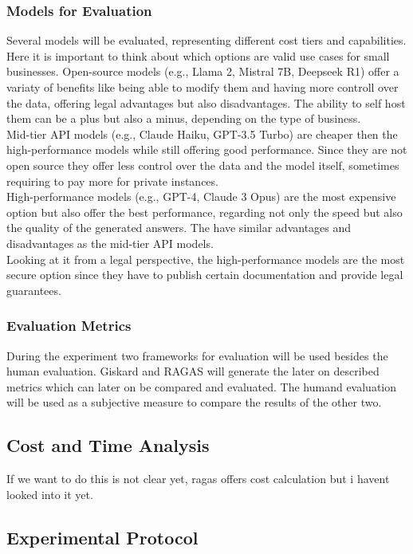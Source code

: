 \subsubsection{Models for Evaluation}
Several models will be evaluated, representing different cost tiers and capabilities.\\
Here it is important to think about which options are valid use cases for small businesses.
Open-source models (e.g., Llama 2, Mistral 7B, Deepseek R1) offer a variaty of benefits like being able to modify them and having more controll over the data, offering legal advantages but also disadvantages. The ability to self host them can be a plus but also a minus, depending on the type of business.\\
Mid-tier API models (e.g., Claude Haiku, GPT-3.5 Turbo) are cheaper then the high-performance models while still offering good performance. Since they are not open source they offer less control over the data and the model itself, sometimes requiring to pay more for private instances.\\
High-performance models (e.g., GPT-4, Claude 3 Opus) are the most expensive option but also offer the best performance, regarding not only the speed but also the quality of the generated answers. The have similar advantages and disadvantages as the mid-tier API models. \\
Looking at it from a legal perspective, the high-performance models are the most secure option since they have to publish certain documentation and provide legal guarantees.

\subsubsection{Evaluation Metrics}
During the experiment two frameworks for evaluation will be used besides the human evaluation.
Giskard and RAGAS will generate the later on described metrics which can later on be compared and evaluated.
The humand evaluation will be used as a subjective measure to compare the results of the other two.

\subsection{Cost and Time Analysis}
If we want to do this is not clear yet, ragas offers cost calculation but i havent looked into it yet.

\subsection{Experimental Protocol}

